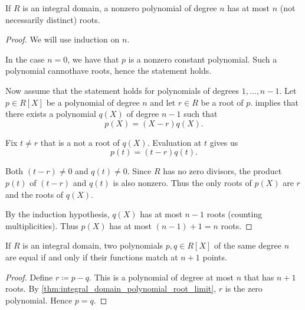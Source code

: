 \begin{proposition}\label{thm:integral_domain_polynomial_root_limit}
  If \( R \) is an integral domain, a nonzero polynomial of degree \( n \) has at most \( n \) (not necessarily distinct) roots.
\end{proposition}
\begin{proof}
  We will use induction on \( n \).

  In the case \( n = 0 \), we have that \( p \) is a nonzero constant polynomial. Such a polynomial cannot\LEM have roots, hence the statement holds.

  Now assume that the statement holds for polynomials of degrees \( 1, \ldots, n - 1 \). Let \( p \in R[X] \) be a polynomial of degree \( n \) and let \( r \in R \) be a root of \( p \).  implies that there exists a polynomial \( q(X) \) of degree \( n - 1 \) such that
  \begin{equation*}
    p(X) = (X - r) q(X).
  \end{equation*}

  Fix \( t \neq r \) that is a not a root of \( q(X) \). Evaluation at \( t \) gives us
  \begin{equation*}
    p(t) = (t - r) q(t).
  \end{equation*}

  Both \( (t - r) \neq 0 \) and \( q(t) \neq 0 \). Since \( R \) has no zero divisors, the product \( p(t) \) of \( (t - r) \) and \( q(t) \) is also nonzero. Thus the only roots of \( p(X) \) are \( r \) and the roots of \( q(X) \).

  By the induction hypothesis, \( q(X) \) has at most \( n - 1 \) roots (counting multiplicities). Thus \( p(X) \) has at most \( (n - 1) + 1 = n \) roots.
\end{proof}

\begin{proposition}\label{thm:polynomials_with_identical_roots}
  If \( R \) is an integral domain, two polynomials \( p, q \in R[X] \) of the same degree \( n \) are equal if and only if their functions match at \( n + 1 \) points.
\end{proposition}
\begin{proof}
  Define \( r \coloneqq p - q \). This is a polynomial of degree at most \( n \) that has \( n + 1 \) roots. By \cref{thm:integral_domain_polynomial_root_limit}, \( r \) is the zero polynomial. Hence \( p = q \).
\end{proof}

